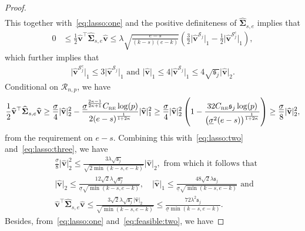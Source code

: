 \documentclass[11pt, a4paper]{article}
\newcommand{\mbf}{\mathbf}
\newcommand{\mc}{\mathcal}
\renewcommand{\l}{\left}
\renewcommand{\r}{\right}
\def\wh{\widehat}
\newcommand{\crsc}{C_{\text{\tiny \upshape RE}}}
\theoremstyle{definition}
\theoremstyle{definition}
\theoremstyle{definition}
\theoremstyle{definition}
\theoremstyle{definition}
\theoremstyle{remark}
\theoremstyle{definition}
\theoremstyle{definition}
\theoremstyle{definition}
\begin{document}
\begin{proof}
\begin{align*}
	\end{align*}
	This together with~\eqref{eq:lasso:one}  and the positive definiteness of $\wh{\bm\Sigma}_{s, e}$ implies that
	\begin{align}
	\label{eq:lasso:two}
	0 &\le \frac{1}{2} \wh{\mbf v}^\top \wh{\bm\Sigma}_{s, e} \wh{\mbf v} \le \lambda \sqrt{\frac{e - s}{(k - s)(e - k)}} \l( \frac{3}{2} \vert \wh{\mbf v}^{\mc S_j} \vert_1 - \frac{1}{2} \vert \wh{\mbf v}^{\mc S_j^c} \vert_1 \r),
	\end{align}
	which further implies that
	\begin{align}
	\label{eq:lasso:three}
	\vert \wh{\mbf v}^{\mc S_j^c} \vert_1 \le 3 \vert \wh{\mbf v}^{\mc S_j} \vert_1 
	\text{ \ and \ }
	\vert \wh{\mbf v} \vert_1 \le 4\vert \wh{\mbf v}^{\mc S_j} \vert_1 \le 4 \sqrt{\mathfrak{s}_j} \vert \wh{\mbf v} \vert_2. 
	\end{align}
	Conditional on $\mc R_{n, p}$, we have
	\begin{align*}
	\frac{1}{2} \wh{\mbf v}^\top \wh{\bm\Sigma}_{s, e} \wh{\mbf v} \ge \frac{\underline{\sigma}}{4} \vert \wh{\mbf v} \vert_2^2 - \frac{{\underline{\sigma}}^{\frac{2\kappa - 1}{2\kappa + 1}} \crsc \log(p)}{2 (e - s)^{\frac{1}{1 + 2\kappa}}} \vert \wh{\mbf v} \vert_1^2 \ge \frac{\underline{\sigma}}{4} \vert \wh{\mbf v} \vert_2^2 \l( 1 - \frac{32 \crsc \mathfrak{s}_j \log(p) }{\bigl(\underline{\sigma}^2(e - s)\bigr)^{\frac{1}{1 + 2\kappa}}} \r) \ge \frac{\underline{\sigma}}{8} \vert \wh{\mbf v} \vert_2^2,
	\end{align*}
	from the requirement on $e - s$.
	Combining this with~\eqref{eq:lasso:two} and~\eqref{eq:lasso:three}, we have
	\begin{align*}
	& \frac{\underline{\sigma}}{8} \vert \wh{\mbf v} \vert_2^2 
	\le \frac{3 \lambda \sqrt{\mathfrak{s}_j}}{\sqrt{2 \min(k - s, e - k)}} \vert \wh{\mbf v} \vert_2,
	\text{ \ from which it follows that}
	\\
	& \vert \wh{\mbf v} \vert_2 \le \frac{12 \sqrt{2} \lambda \sqrt{\mathfrak{s}_j}}{\underline{\sigma} \sqrt{\min(k - s, e - k)}},
	\quad
	\vert \wh{\mbf v} \vert_1 \le \frac{48 \sqrt{2} \lambda \mathfrak{s}_j}{\underline{\sigma} \sqrt{\min(k - s, e - k)}} \text{ \ and }
	\\
	&  \wh{\mbf v}^\top \wh{\bm\Sigma}_{s, e} \wh{\mbf v} \le \frac{3 \sqrt{2} \lambda \sqrt{\mathfrak{s}_j} \vert \wh{\mbf v} \vert_2}{\sqrt{\min(k - s, e - k)}} \le \frac{72 \lambda^2 \mathfrak{s}_j}{\underline{\sigma} {\min(k - s, e - k)}}.
	\end{align*}
	Besides, from~\eqref{eq:lasso:one} and~\eqref{eq:feasible:two}, we have

\end{proof}
\end{document}
